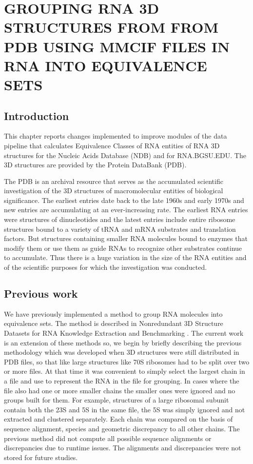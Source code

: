 \chapter{GROUPING RNA 3D STRUCTURES FROM FROM PDB USING MMCIF FILES IN RNA INTO
EQUIVALENCE SETS}

\section{Introduction}

This chapter reports changes implemented to improve modules of the data pipeline
that calculates Equivalence Classes of RNA entities of RNA 3D structures for the
Nucleic Acids Database (NDB) and for RNA.BGSU.EDU. The 3D structures are
provided by the Protein DataBank (PDB). 

The PDB is an archival resource that serves as  the accumulated scientific
investigation of the 3D structures of macromolecular entities of biological
significance. The earliest entries date back to the late 1960s and early 1970s
and new entries are accumulating at an ever-increasing rate. The earliest RNA
entries were structures of dinucleotides and the latest entries include entire
ribosome structures bound to a variety of tRNA and mRNA substrates and
translation factors. But structures containing smaller RNA molecules bound to
enzymes that modify them or use them as guide RNAs  to recognize other
substrates continue to accumulate. Thus there is a huge variation in the size of
the RNA entities and of the scientific purposes for which the investigation was
conducted.

\section{Previous work}

We have previously implemented a method to group RNA molecules into equivalence
sets. The method is described in Nonredundant 3D Structure Datasets for RNA
Knowledge Extraction and Benchmarking \cite{Leontis2012b}. The current work is
an extension of these methods so, we begin by briefly describing the previous
methodology which was developed when 3D structures were still distributed in PDB
files, so that like large structures like 70S ribosomes had to be split over two
or more files. At that time it was convenient to simply select the largest chain
in a file and use to represent the RNA in the file for grouping. In cases where
the file also had one or more smaller chains the smaller ones were ignored and
no groups built for them. For example, structures of a large ribosomal subunit
contain both the 23S and 5S in the same file, the 5S was simply ignored and not
extracted and clustered separately. Each chain was compared on the basis of
sequence alignment, species and geometric discrepancy to all other chains. The
previous method did not compute all possible sequence alignments or
discrepancies due to runtime issues. The alignments and discrepancies were not
stored for future studies. 

